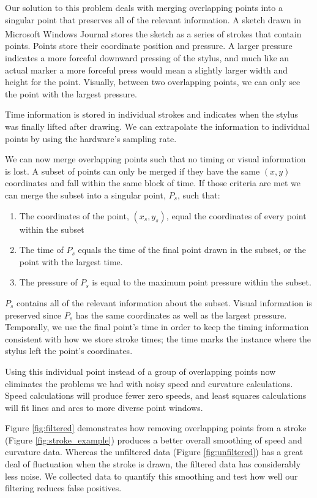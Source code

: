\documentclass[10pt]{acmsiggraph}          %
\begin{document}
Our solution to this problem deals with merging overlapping points into a singular point that preserves all of the relevant information. A sketch drawn in Microsoft\textsuperscript{\textregistered} Windows Journal stores the sketch as a series of strokes that contain points.  Points store their coordinate position and pressure. A larger pressure indicates a more forceful downward pressing of the stylus, and much like an actual marker a more forceful press would
mean a slightly larger width and height for the point. Visually, between two overlapping points, we can only see the point with the largest pressure.

Time information is stored in individual strokes and indicates when the stylus was finally lifted after drawing. We can extrapolate
the information to individual points by using the hardware's sampling rate.

We can now merge overlapping points such that no timing or visual information is lost. A subset of points can only be merged if they have the same $(x,y)$ coordinates
and fall within the same block of time. If those criteria are met we can merge the subset into a singular point, $P_s$, such that:

\begin{enumerate}
  \item The coordinates of the point, $(x_s,y_s)$, equal the coordinates of every point within the subset
  \item The time of $P_s$ equals the time of the final point drawn in the subset, or the point with the largest time.
  \item The pressure of $P_s$ is equal to the maximum point pressure within the subset.
\end{enumerate}

\noindent $P_s$ contains all of the relevant information about the subset. Visual information is preserved since $P_s$ has the same coordinates as well as the largest pressure.  Temporally, we use the final point's time in order to keep the timing information consistent with how we store stroke times; the time marks the instance where the stylus left the point's coordinates. 

Using this individual point instead of a group of overlapping points now eliminates the problems we had with noisy speed and curvature calculations. Speed calculations
will produce fewer zero speeds, and least squares calculations will fit lines and arcs to more diverse point windows. 

Figure \ref{fig:filtered} demonstrates how removing overlapping points from a stroke (Figure \ref{fig:stroke_example}) produces a better overall smoothing of speed and curvature data. Whereas the unfiltered data (Figure \ref{fig:unfiltered}) has a great deal of fluctuation when the stroke is drawn, the filtered data has considerably less noise. We collected data to quantify this smoothing and test how well our filtering reduces false positives.
\end{document}
